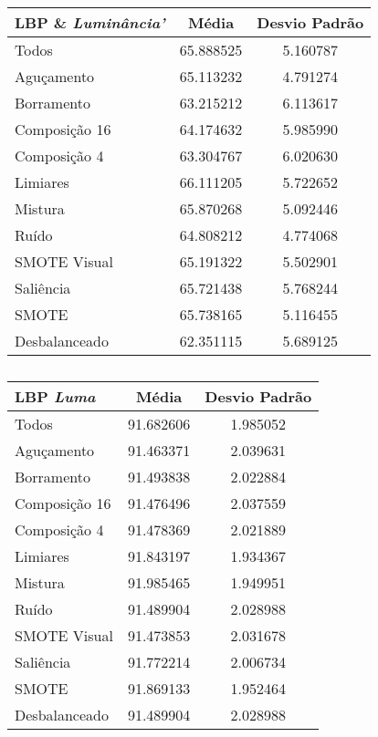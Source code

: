 \begin{table}[!htbp]
\centering
\caption{}
\label{tab:resultados:x:melhor}
\begin{tabular}{|l|c|c|}
\hline
\textbf{LBP  \& \emph{Luminância'}} & \textbf{Média}     & \textbf{Desvio Padrão} \\ \hline
   Todos        &  65.888525 &  5.160787  \\ \hline
  Aguçamento    &  65.113232 &  4.791274  \\ \hline
  Borramento    &  63.215212 &  6.113617  \\ \hline
  Composição 16 &  64.174632 &  5.985990  \\ \hline
  Composição 4  &  63.304767 &  6.020630  \\ \hline
  Limiares      &  66.111205 &  5.722652  \\ \hline
  Mistura       &  65.870268 &  5.092446  \\ \hline
  Ruído         &  64.808212 &  4.774068  \\ \hline
  SMOTE Visual  &  65.191322 &  5.502901  \\ \hline
  Saliência     &  65.721438 &  5.768244  \\ \hline
 SMOTE          &  65.738165 &  5.116455  \\ \hline
Desbalanceado   &  62.351115 &  5.689125  \\ \hline
\end{tabular}
\end{table}


\begin{table}[!htbp]
\centering
\caption{}
\label{tab:resultados:x:melhor}
\begin{tabular}{|l|c|c|}
\hline
\textbf{LBP \emph{Luma}} & \textbf{Média}     & \textbf{Desvio Padrão} \\ \hline
   Todos        &  91.682606 &  1.985052  \\ \hline
  Aguçamento    &  91.463371 &  2.039631  \\ \hline
  Borramento    &  91.493838 &  2.022884  \\ \hline
  Composição 16 &  91.476496 &  2.037559  \\ \hline
  Composição 4  &  91.478369 &  2.021889  \\ \hline
  Limiares      &  91.843197 &  1.934367  \\ \hline
  Mistura       &  91.985465 &  1.949951  \\ \hline
  Ruído         &  91.489904 &  2.028988  \\ \hline
  SMOTE Visual  &  91.473853 &  2.031678  \\ \hline
  Saliência     &  91.772214 &  2.006734  \\ \hline
 SMOTE          &  91.869133 &  1.952464  \\ \hline
Desbalanceado   &  91.489904 &  2.028988  \\ \hline
\end{tabular}
\end{table}

